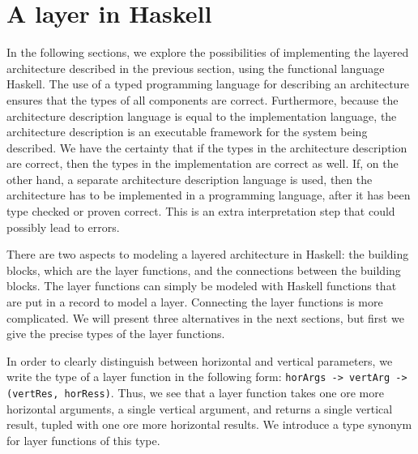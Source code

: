 %																
%																
%																
\section{A layer in Haskell}

In the following sections, we explore the possibilities of implementing the layered architecture described in the previous section, using the functional language Haskell. The use of a typed programming language for describing an architecture ensures that the types of all components are correct. Furthermore, because the architecture description language is equal to the implementation language, the architecture description is an executable framework for the system being described. We have the certainty that if the types in the architecture description are correct, then the types in the implementation are correct as well. If, on the other hand, a separate architecture description language is used, then the architecture has to be implemented in a programming language, after it has been type checked or proven correct. This is an extra interpretation step that could possibly lead to errors.

There are two aspects to modeling a layered architecture in Haskell: the building blocks, which are the layer functions, and the connections between the building blocks. The layer functions can simply be modeled with Haskell functions that are put in a record to model a layer. Connecting the layer functions is more complicated. We will present three alternatives in the next sections, but first we give the precise types of the layer functions. 

In order to clearly distinguish between horizontal and vertical parameters, we write the type of a layer function in the following form: \texttt{horArgs -> vertArg -> (vertRes, horRess)}. Thus, we see that a layer function takes one ore more horizontal arguments, a single vertical argument, and returns a single vertical result, tupled with one ore more horizontal results. We introduce a type synonym for layer functions of this type. 


